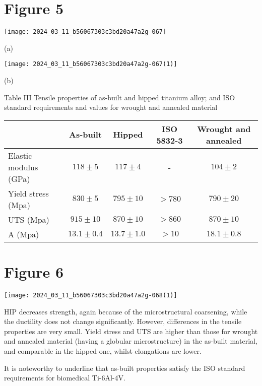 \documentclass[10pt]{article}
\begin{document}
\section*{Figure 5}
\begin{center}
\texttt{[image: 2024\_03\_11\_b56067303c3bd20a47a2g-067]}
\end{center}

(a)

\begin{center}
\texttt{[image: 2024\_03\_11\_b56067303c3bd20a47a2g-067(1)]}
\end{center}

(b)

Table III Tensile properties of as-built and hipped titanium alloy; and ISO standard requirements and values for wrought and annealed material

\begin{center}
\begin{tabular}{lcccc}
\hline
 & As-built & Hipped & ISO 5832-3 & Wrought and annealed \\
\hline
Elastic modulus (GPa) & $118 \pm 5$ & $117 \pm 4$ & - & $104 \pm 2$ \\
Yield stress (Mpa) & $830 \pm 5$ & $795 \pm 10$ & $>780$ & $790 \pm 20$ \\
UTS (Mpa) & $915 \pm 10$ & $870 \pm 10$ & $>860$ & $870 \pm 10$ \\
A (Mpa) & $13.1 \pm 0.4$ & $13.7 \pm 1.0$ & $>10$ & $18.1 \pm 0.8$ \\
\hline
\end{tabular}
\end{center}

\section*{Figure 6}
\begin{center}
\texttt{[image: 2024\_03\_11\_b56067303c3bd20a47a2g-068(1)]}
\end{center}

HIP decreases strength, again because of the microstructural coarsening, while the ductility does not change significantly. However, differences in the tensile properties are very small. Yield stress and UTS are higher than those for wrought and annealed material (having a globular microstructure) in the as-built material, and comparable in the hipped one, whilst elongations are lower.

It is noteworthy to underline that as-built properties satisfy the ISO standard requirements for biomedical Ti-6Al-4V.
\end{document}
